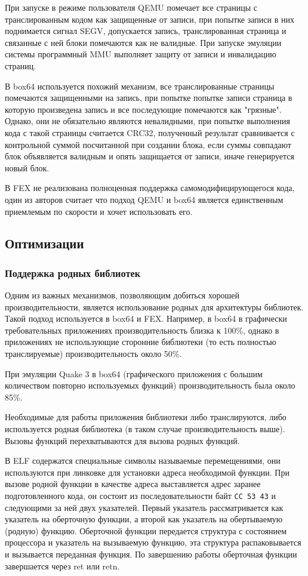 При запуске в режиме пользователя QEMU помечает все страницы с транслированным кодом как защищенные от записи, при попытке записи в них поднимается сигнал SEGV, допускается запись, транслированная страница и связанные с ней блоки помечаются как не валидные. При запуске эмуляции системы программный MMU выполняет защиту от записи и инвалидацию страниц. \cite{qemu_docs}

В box64 используется похожий механизм, все транслированные страницы помечаются защищенными на запись, при попытке попытке записи страница в которую произведена запись и все последующие помечаются как "грязные". Однако, они не обязательно являются невалидными, при попытке выполнения кода с такой страницы считается CRC32, полученный результат сравнивается с контрольной суммой посчитанной при создании блока, если суммы совпадают блок объявляется валидным и опять защищается от записи, иначе генерируется новый блок. \cite{box64_letter}

В FEX не реализована полноценная поддержка самомодифицирующегося кода, один из авторов считает что подход QEMU и box64 является единственным приемлемым по скорости и хочет использовать его. \cite{FEX_letter}

\subsection{Оптимизации}

\subsubsection{Поддержка родных библиотек}

Одним из важных механизмов, позволяющим добиться хорошей производительности, является использование родных для архитектуры библиотек. Такой подход используется в box64 и FEX. Например, в box64 в графически требовательных приложениях производительность близка к 100\%, однако в приложениях не использующие сторонние библиотеки (то есть полностью транслируемые) производительность около 50\%.

При эмуляции Quake 3 в box64 (графического приложения с большим количеством повторно используемых функций) производительность была около 85\%.

Необходимые для работы приложения библиотеки либо транслируются, либо используется родная библиотека (в таком случае производительность выше). Вызовы функций перехватываются для вызова родных функций. 

В ELF содержатся специальные символы называемые перемещениями, они используются при линковке для установки адреса необходимой функции. При вызове родной функции в качестве адреса выставляется адрес заранее подготовленного кода, он состоит из последовательности байт \texttt{CC 53 43} и следующими за ней двух указателей. Первый указатель рассматривается как указатель на оберточную функции, а второй как указатель на обертываемую (родную) функцию. Оберточной функции передается структура с состоянием процессора и указатель на вызываемую функцию, эта структура распаковывается и вызывается переданная функция. По завершению работы оберточная функции завершается через ret или retn.

